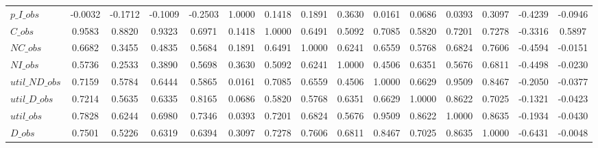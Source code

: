 \begin{center}
\begin{longtable}{lcccccccccccccc}
$p\_I\_obs      $	 & 	          -0.0032	 & 	          -0.1712	 & 	          -0.1009	 & 	          -0.2503	 & 	           1.0000	 & 	           0.1418	 & 	           0.1891	 & 	           0.3630	 & 	           0.0161	 & 	           0.0686	 & 	           0.0393	 & 	           0.3097	 & 	          -0.4239	 & 	          -0.0946 \\ 
$C\_obs         $	 & 	           0.9583	 & 	           0.8820	 & 	           0.9323	 & 	           0.6971	 & 	           0.1418	 & 	           1.0000	 & 	           0.6491	 & 	           0.5092	 & 	           0.7085	 & 	           0.5820	 & 	           0.7201	 & 	           0.7278	 & 	          -0.3316	 & 	           0.5897 \\ 
$NC\_obs        $	 & 	           0.6682	 & 	           0.3455	 & 	           0.4835	 & 	           0.5684	 & 	           0.1891	 & 	           0.6491	 & 	           1.0000	 & 	           0.6241	 & 	           0.6559	 & 	           0.5768	 & 	           0.6824	 & 	           0.7606	 & 	          -0.4594	 & 	          -0.0151 \\ 
$NI\_obs        $	 & 	           0.5736	 & 	           0.2533	 & 	           0.3890	 & 	           0.5698	 & 	           0.3630	 & 	           0.5092	 & 	           0.6241	 & 	           1.0000	 & 	           0.4506	 & 	           0.6351	 & 	           0.5676	 & 	           0.6811	 & 	          -0.4498	 & 	          -0.0230 \\ 
$util\_ND\_obs  $	 & 	           0.7159	 & 	           0.5784	 & 	           0.6444	 & 	           0.5865	 & 	           0.0161	 & 	           0.7085	 & 	           0.6559	 & 	           0.4506	 & 	           1.0000	 & 	           0.6629	 & 	           0.9509	 & 	           0.8467	 & 	          -0.2050	 & 	          -0.0377 \\ 
$util\_D\_obs   $	 & 	           0.7214	 & 	           0.5635	 & 	           0.6335	 & 	           0.8165	 & 	           0.0686	 & 	           0.5820	 & 	           0.5768	 & 	           0.6351	 & 	           0.6629	 & 	           1.0000	 & 	           0.8622	 & 	           0.7025	 & 	          -0.1321	 & 	          -0.0423 \\ 
$util\_obs      $	 & 	           0.7828	 & 	           0.6244	 & 	           0.6980	 & 	           0.7346	 & 	           0.0393	 & 	           0.7201	 & 	           0.6824	 & 	           0.5676	 & 	           0.9509	 & 	           0.8622	 & 	           1.0000	 & 	           0.8635	 & 	          -0.1934	 & 	          -0.0430 \\ 
$D\_obs         $	 & 	           0.7501	 & 	           0.5226	 & 	           0.6319	 & 	           0.6394	 & 	           0.3097	 & 	           0.7278	 & 	           0.7606	 & 	           0.6811	 & 	           0.8467	 & 	           0.7025	 & 	           0.8635	 & 	           1.0000	 & 	          -0.6431	 & 	          -0.0048 \\ 

\end{longtable}
\end{center}
